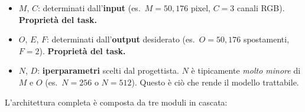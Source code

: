 \documentclass[12pt,a4paper]{article}
\begin{document}
\begin{notabox}
\begin{itemize}
    \item $M$, $C$: determinati dall'\textbf{input} (es.\ $M = 50{,}176$ pixel, $C = 3$ canali RGB). \textbf{Propriet\`a del task.}
    \item $O$, $E$, $F$: determinati dall'\textbf{output} desiderato (es.\ $O = 50{,}176$ spostamenti, $F = 2$). \textbf{Propriet\`a del task.}
    \item $N$, $D$: \textbf{iperparametri} scelti dal progettista. $N$ \`e tipicamente \emph{molto minore} di $M$ e $O$ (es.\ $N = 256$ o $N = 512$). Questo \`e ci\`o che rende il modello trattabile.
\end{itemize}
\end{notabox}

L'architettura completa \`e composta da tre moduli in cascata:
\end{document}
